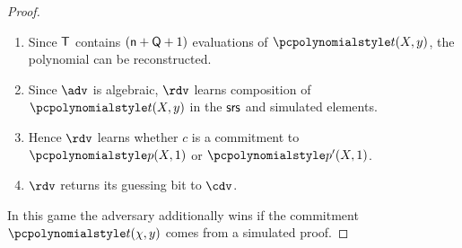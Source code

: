 \documentclass[runningheads,11pt]{llncs}
\begin{document}
\begin{proof}
\begin{enumerate}
  \item Since $\mathsf{T}$ contains $(\mathsf{n} + \mathsf{Q} + 1)$ evaluations of
    $\p{t} (X, y)$, the polynomial can be reconstructed.
  \item Since $\adv$ is algebraic, $\rdv$ learns composition of $\p{t} (X, y)$
    in the $\mathsf{srs}$ and simulated elements.
  \item Hence $\rdv$ learns whether $c$ is a commitment to $\p{p} (X, 1)$ or
    $\p{p'} (X, 1)$.
  \item $\rdv$ returns its guessing bit to $\cdv$.
  \end{enumerate}

   In this game the adversary additionally wins if the commitment
  $\p{t} (\chi, y)$ comes from a simulated proof.


\end{proof}
\end{document}
